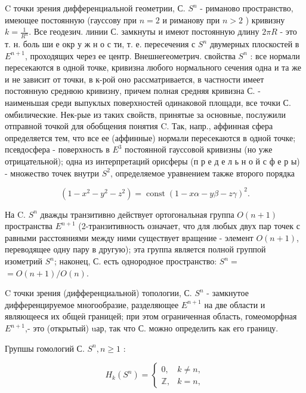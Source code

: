 \documentclass[10pt]{article}
\begin{document}
C точки зрения дифференциальной геометрии, С. $S^{n}$ - риманово пространство, имеющее постоянную (гауссову при $n=2$ и риманову при $n>2$ ) кривизну $k=\frac{1}{R^{n}}$. Все геодезич. линии С. замкнуты и имеют постоянную длину $2 \pi R$ - это т. н. боль ши е окр у ж н о с ти, т. е. пересечения с $S^{n}$ двумерных плоскостей в $E^{n+1}$, проходящих через ее центр. Внешнегеометрич. свойства $S^{n}$ : все нормали пересекаются в одной точке, кривизна любого нормального сечения одна и та же и не зависит от точки, в к-рой оно рассматривается, в частности имеет постоянную среднюю кривизну, причем полная средняя кривизна С. - наименьшая среди выпуклых поверхностей одинаковой площади, все точки С. омбилические. Нек-рые из таких свойств, принятые за основные, послужили отправной точкой для обобщения понятия C. Так, напр., аффинная сфера определяется тем, что все ее (аффинные) нормали пересекаются в одной точке; псевдосфера - поверхность в $E^{3}$ постоянной гауссовой кривизны (но уже отрицательной); одна из интерпретаций орисферы (п р е д е л ь н о й с ф е р ы) - множество точек внутри $S^{2}$, определяемое уравнением также второго порядка



\[

\left(1-x^{2}-y^{2}-z^{2}\right)=\operatorname{const}(1-x \alpha-y \beta-z \gamma)^{2} .

\]



На C. $S^{n}$ дважды транзитивно действует ортогональная группа $O(n+1)$ пространства $E^{n+1}$ (2-транзитивность означает, что для любых двух пар точек с равными расстояниями между ними существует вращение - элемент $O(n+1)$, переводящее одну пару в другую); эта группа является полной группой изометрий $S^{n}$; наконец, С. есть однородное пространство: $S^{n}=$ $=O(n+1) / O(n)$.



$\mathrm{C}$ точки зрения (дифференциальной) топологии, С. $S^{n}$ - замкнутое дифференцируемое многообразие, разделяющее $E^{n+1}$ на две области и являющееся их общеӥ границей; при этом ограниченная область, гомеоморфная $E^{n+1}$,- это (открытый) uар, так что С. можно определить как его границу.



Групшы гомологий С. $S^{n}, n \geqslant 1$ :



\[

H_{k}\left(S^{n}\right)= \begin{cases}0, & k \neq n, \\ \mathbb{Z}, & k=n,\end{cases}

\]
\end{document}
